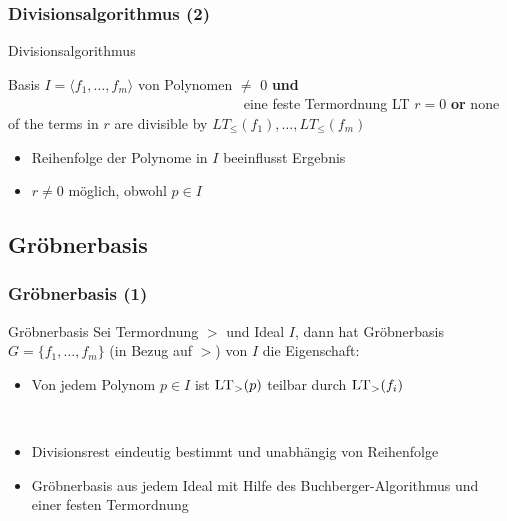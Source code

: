 \documentclass{beamer}
\begin{document}
\begin{frame}[fragile]
\frametitle{Divisionsalgorithmus (2)}




\begin{algorithm}[H]
\caption{Divisionsalgorithmus  }

\begin{algorithmic}[1]

\Require Basis $I = \langle f_{1}, \dots, f_{m}\rangle$ von Polynomen $\neq$ 0 \textbf{und} ~~~~~~~~~~~~~~~~~~~~~~~~~~~~~~~~~ eine feste Termordnung \textsc{LT}  
\Ensure $r=0$ \textbf{or} none of the terms in $r$ are divisible by $ LT_{\leq}\left( f_{1}\right) , \dots , LT_{\leq} \left( f_{m}\right) $

\end{algorithmic}
\end{algorithm}


\begin{itemize}
\item Reihenfolge der Polynome in $I$ beeinflusst Ergebnis
\item $r \neq 0$ möglich, obwohl $p \in I$ 
\end{itemize}


\end{frame}



\subsection{Gröbnerbasis}


\begin{frame}[fragile]
\frametitle{Gröbnerbasis (1)}


\begin{block}{Gröbnerbasis  }
Sei Termordnung $>$ und Ideal $I$, dann hat Gröbnerbasis $G = \{f_{1}, \ldots, f_{m} \}$ (in Bezug auf $>$) von $I$ die Eigenschaft: 
\begin{itemize}
\item Von jedem Polynom $p \in I$ ist $\textsc{LT}_{>}(p)$ teilbar durch $\textsc{LT}_{>}(f_{i})$  
\end{itemize} 
\end{block}

~\\
\begin{itemize}
\item Divisionsrest eindeutig bestimmt und unabhängig von Reihenfolge
~\\
\item Gröbnerbasis aus jedem Ideal mit Hilfe des Buchberger-Algorithmus und einer festen Termordnung 
\end{itemize}



\end{frame}
\end{document}

